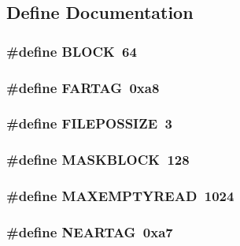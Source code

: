 \subsection{Define Documentation}
\hypertarget{ID__CA_8C_a52220397ecea855b3a99746e451426e1}{
\subsubsection[{BLOCK}]{\setlength{\rightskip}{0pt plus 5cm}\#define BLOCK~64}}
\label{ID__CA_8C_a52220397ecea855b3a99746e451426e1}
\hypertarget{ID__CA_8C_a8bab425cc3ee80e6da6376848fa5ede0}{
\subsubsection[{FARTAG}]{\setlength{\rightskip}{0pt plus 5cm}\#define FARTAG~0xa8}}
\label{ID__CA_8C_a8bab425cc3ee80e6da6376848fa5ede0}
\hypertarget{ID__CA_8C_a6ec6ce39ad4745cc6276d6b7708183dc}{
\subsubsection[{FILEPOSSIZE}]{\setlength{\rightskip}{0pt plus 5cm}\#define FILEPOSSIZE~3}}
\label{ID__CA_8C_a6ec6ce39ad4745cc6276d6b7708183dc}
\hypertarget{ID__CA_8C_ad081e7628ee9025fbe6b3bbef4dbf828}{
\subsubsection[{MASKBLOCK}]{\setlength{\rightskip}{0pt plus 5cm}\#define MASKBLOCK~128}}
\label{ID__CA_8C_ad081e7628ee9025fbe6b3bbef4dbf828}
\hypertarget{ID__CA_8C_a935ef893851d6e31fa292608599c5296}{
\subsubsection[{MAXEMPTYREAD}]{\setlength{\rightskip}{0pt plus 5cm}\#define MAXEMPTYREAD~1024}}
\label{ID__CA_8C_a935ef893851d6e31fa292608599c5296}
\hypertarget{ID__CA_8C_ae6cc998927a70622236023a6afd3baa3}{
\subsubsection[{NEARTAG}]{\setlength{\rightskip}{0pt plus 5cm}\#define NEARTAG~0xa7}}
